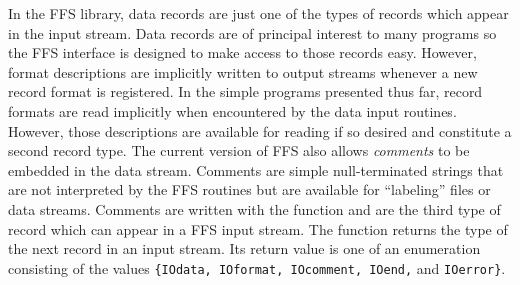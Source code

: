 In the FFS library, data records are just one of the types of records which
appear in the input stream.  Data records are of principal interest to many
programs so the FFS interface is designed to make access to those records
easy.  However, format descriptions are implicitly written to output streams
whenever a new record format is registered.  In the simple programs presented
thus far, record formats are read implicitly when encountered by the data
input routines.  However, those descriptions are available for reading if so
desired and constitute a second record type.  The current version of FFS also
allows {\it comments} to be embedded in the data stream.  Comments are simple
null-terminated strings that are not interpreted by the FFS routines but are
available for ``labeling'' files or data streams.  Comments are written with
the  function and are the third  type of record which can
appear in  a FFS input stream.  The function  returns
the type of the next record in an input stream.  Its return value is one of an
enumeration consisting of the values {\tt \{IOdata, IOformat, IOcomment, IOend,}
and {\tt IOerror\}}.  
